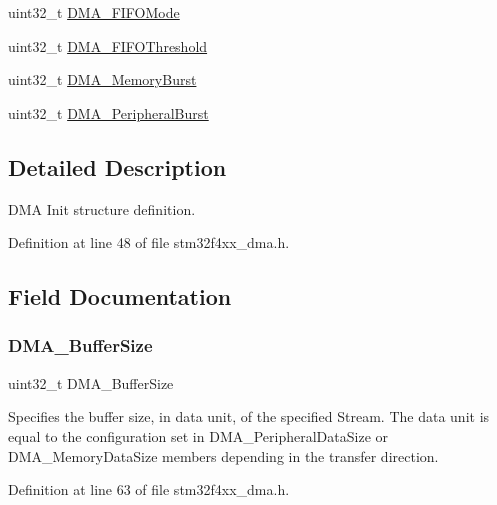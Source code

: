 \begin{DoxyCompactItemize}
\item 
uint32\+\_\+t \hyperlink{struct_d_m_a___init_type_def_a684555f9f5644259b7c4ca446b6dcf8f}{D\+M\+A\+\_\+\+F\+I\+F\+O\+Mode}
\item 
uint32\+\_\+t \hyperlink{struct_d_m_a___init_type_def_a2bbb3ea272279aa5cddef702e153a09d}{D\+M\+A\+\_\+\+F\+I\+F\+O\+Threshold}
\item 
uint32\+\_\+t \hyperlink{struct_d_m_a___init_type_def_a90987eb939726acf365f2bf039a51725}{D\+M\+A\+\_\+\+Memory\+Burst}
\item 
uint32\+\_\+t \hyperlink{struct_d_m_a___init_type_def_a6772e281310a3e93781364c723984138}{D\+M\+A\+\_\+\+Peripheral\+Burst}
\end{DoxyCompactItemize}


\subsection{Detailed Description}
D\+MA Init structure definition. 

Definition at line 48 of file stm32f4xx\+\_\+dma.\+h.



\subsection{Field Documentation}
\mbox{\label{struct_d_m_a___init_type_def_ad5e4b9069a7a145b3312d54d09059f78}} 
\subsubsection{\texorpdfstring{D\+M\+A\+\_\+\+Buffer\+Size}{DMA\_BufferSize}}
{\footnotesize\ttfamily uint32\+\_\+t D\+M\+A\+\_\+\+Buffer\+Size}

Specifies the buffer size, in data unit, of the specified Stream. The data unit is equal to the configuration set in D\+M\+A\+\_\+\+Peripheral\+Data\+Size or D\+M\+A\+\_\+\+Memory\+Data\+Size members depending in the transfer direction. 

Definition at line 63 of file stm32f4xx\+\_\+dma.\+h.

\mbox{\label{struct_d_m_a___init_type_def_afae070f2d49543b1acd3e318c6de8527}} 
